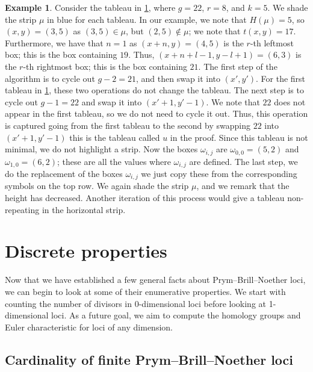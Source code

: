 \documentclass[11pt,reqno]{amsart}
\theoremstyle{definition}
\theoremstyle{problem}
\newtheorem{example}[definition]{Example}
\theoremstyle{plain}
\theoremstyle{remark}
\theoremstyle{theorem}
\numberwithin{equation}{section}
\numberwithin{figure}{section}
\begin{document}
\begin{example}\label{ex:3}
  Consider the tableau in \cref{fig:path-connected-odd-ex}, where
  $g=22$, $r=8$, and $k=5$. We shade the strip $\mu$ in blue for each
  tableau. In our example, we note that $H(\mu)=5$, so $(x,y)=(3,5)$
  as $(3,5)\in \mu$, but $(2,5)\notin\mu$; we note that
  $t(x,y)=17$. Furthermore, we have that $n=1$ as $(x+n,y)=(4,5)$ is
  the $r$-th leftmost box; this is the box containing $19$. Thus,
  $(x+n+l-1,y-l+1)=(6,3)$ is the $r$-th rightmost box; this is the box
  containing $21$. The first step of the algorithm is to cycle out
  $g-2=21$, and then swap it into $(x',y')$. For the first tableau in
  \cref{fig:path-connected-odd-ex}, these two operations do not change
  the tableau. The next step is to cycle out $g-1=22$ and swap it into
  $(x'+1,y'-1)$. We note that $22$ does not appear in the first
  tableau, so we do not need to cycle it out. Thus, this operation is
  captured going from the first tableau to the second by swapping $22$
  into $(x'+1,y'-1)$ this is the tableau called $u$ in the
  proof. Since this tableau is not minimal, we do not highlight a
  strip. Now the boxes $\omega_{i,j}$ are $\omega_{0,0}=(5,2)$ and
  $\omega_{1,0}=(6,2)$; these are all the values where $\omega_{i,j}$
  are defined. The last step, we do the replacement of the boxes
  $\omega_{i,j}$ we just copy these from the corresponding symbols on
  the top row. We again shade the strip $\mu$, and we remark that the
  height has decreased. Another iteration of this process would give a
  tableau non-repeating in the horizontal strip.
  \begin{figure}[H]
    
    \caption{}
    \label{fig:path-connected-odd-ex}
  \end{figure}
\end{example}

\section{Discrete properties}\label{sec:counting}

Now that we have established a few general facts about Prym--Brill--Noether loci, we can begin to look at some of their enumerative properties. We start with counting the number of divisors in 0-dimensional loci before looking at 1-dimensional loci. As a future goal, we aim to compute the homology groups and Euler characteristic for loci of any dimension. 

\subsection{Cardinality of finite Prym--Brill--Noether loci}
\end{document}
